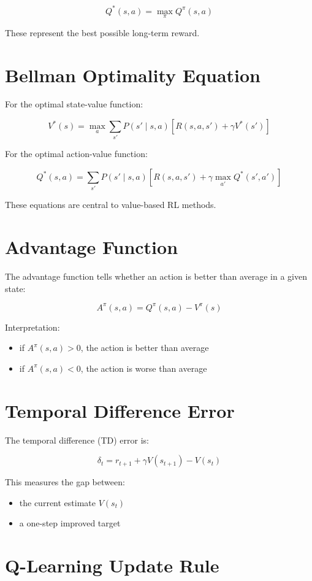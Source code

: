 \documentclass[11pt]{article}
\begin{document}
\[
Q^*(s,a) = \max_{\pi} Q^{\pi}(s,a)
\]

These represent the best possible long-term reward.

\section{Bellman Optimality Equation}

For the optimal state-value function:

\[
V^*(s) = \max_{a} \sum_{s'} P(s' \mid s,a)
\left[ R(s,a,s') + \gamma V^*(s') \right]
\]

For the optimal action-value function:

\[
Q^*(s,a) = \sum_{s'} P(s' \mid s,a)
\left[ R(s,a,s') + \gamma \max_{a'} Q^*(s',a') \right]
\]

These equations are central to value-based RL methods.

\section{Advantage Function}

The advantage function tells whether an action is better than average in a given state:

\[
A^{\pi}(s,a) = Q^{\pi}(s,a) - V^{\pi}(s)
\]

Interpretation:
\begin{itemize}
    \item if $A^{\pi}(s,a) > 0$, the action is better than average
    \item if $A^{\pi}(s,a) < 0$, the action is worse than average
\end{itemize}

\section{Temporal Difference Error}

The temporal difference (TD) error is:

\[
\delta_t = r_{t+1} + \gamma V(s_{t+1}) - V(s_t)
\]

This measures the gap between:
\begin{itemize}
    \item the current estimate $V(s_t)$
    \item a one-step improved target
\end{itemize}

\section{Q-Learning Update Rule}
\end{document}
